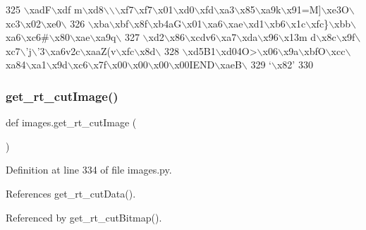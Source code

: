 \begin{DoxyCode}
325 \textcolor{stringliteral}{\(\backslash\)xadF\(\backslash\)xdf m\(\backslash\)xd8\(\backslash\)\(\backslash\)\(\backslash\)xf7\(\backslash\)xf7\(\backslash\)x01\(\backslash\)xd0\(\backslash\)xfd\(\backslash\)xa3\(\backslash\)x85\(\backslash\)xa9k\(\backslash\)x91=M]\(\backslash\)xe3O\(\backslash\)xc3\(\backslash\)x02\(\backslash\)xe0\(\backslash\)}
326 \textcolor{stringliteral}{\(\backslash\)xba\(\backslash\)xbf\(\backslash\)x8f\(\backslash\)xb4aG\(\backslash\)x01\(\backslash\)xa6\(\backslash\)xae\(\backslash\)xd1\(\backslash\)xb6\(\backslash\)x1c\(\backslash\)xfc\}\(\backslash\)xbb\(\backslash\)xa6\(\backslash\)xc6#\(\backslash\)x80\(\backslash\)xae\(\backslash\)xa9q\(\backslash\)}
327 \textcolor{stringliteral}{\(\backslash\)xd2\(\backslash\)x86\(\backslash\)xcdv6\(\backslash\)xa7\(\backslash\)xda\(\backslash\)x96\(\backslash\)x13m d\(\backslash\)x8c\(\backslash\)x9f\(\backslash\)xc7\(\backslash\)'j\(\backslash\)'3\(\backslash\)xa6v2c\(\backslash\)xaaZ(v\(\backslash\)xfc\(\backslash\)x8d\(\backslash\)}
328 \textcolor{stringliteral}{\(\backslash\)xd5B1\(\backslash\)xd04O>\(\backslash\)x06\(\backslash\)x9a\(\backslash\)xbfO\(\backslash\)xcc\(\backslash\)xa84\(\backslash\)xa1\(\backslash\)x9d\(\backslash\)xc6\(\backslash\)x7f\(\backslash\)x00\(\backslash\)x00\(\backslash\)x00\(\backslash\)x00IEND\(\backslash\)xaeB\(\backslash\)}
329 \textcolor{stringliteral}{`\(\backslash\)x82'}
330 
\end{DoxyCode}
\mbox{\label{namespaceimages_afb08afa7f129f5a1687116c72ff11b35}} 
\subsubsection{\texorpdfstring{get\+\_\+rt\+\_\+cut\+Image()}{get\_rt\_cutImage()}}
{\footnotesize\ttfamily def images.\+get\+\_\+rt\+\_\+cut\+Image (\begin{DoxyParamCaption}{ }\end{DoxyParamCaption})}



Definition at line 334 of file images.\+py.



References get\+\_\+rt\+\_\+cut\+Data().



Referenced by get\+\_\+rt\+\_\+cut\+Bitmap().


